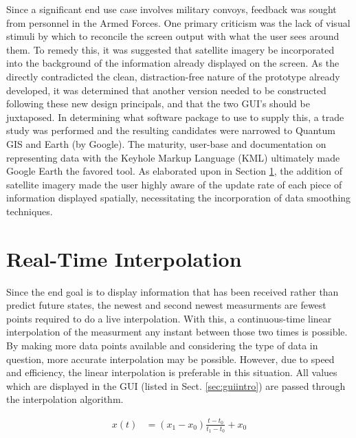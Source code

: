 \documentclass[12pt]{report}
\begin{document}
Since a significant end use case involves military convoys, feedback was sought from personnel in the Armed Forces. One primary criticism was the lack of visual stimuli by which to reconcile the screen output with what the user sees around them. To remedy this, it was suggested that satellite imagery be incorporated into the background of the information already displayed on the screen. As the directly contradicted the clean, distraction-free nature of the prototype already developed, it was determined that another version needed to be constructed following these new design principals, and that the two GUI's should be juxtaposed. In determining what software package to use to supply this, a trade study was performed and the resulting candidates were narrowed to Quantum GIS and Earth (by Google). The maturity, user-base and documentation on representing data with the Keyhole Markup Language (KML) ultimately made Google Earth the favored tool. As elaborated upon in Section \ref{sec:interp}, the addition of satellite imagery made the user highly aware of the update rate of each piece of information displayed spatially, necessitating the incorporation of data smoothing techniques.

\section{Real-Time Interpolation} \label{sec:interp}

Since the end goal is to display information that has been received rather than predict future states, the newest and second newest measurments are fewest points required to do a live interpolation. With this, a continuous-time linear interpolation of the measurment any instant between those two times is possible. By making more data points available and considering the type of data in question, more accurate interpolation may be possible. However, due to speed and efficiency, the linear interpolation is preferable in this situation. All values which are displayed in the GUI (listed in Sect. \ref{sec:guiintro}) are passed through the interpolation algorithm.

\begin{align} \label{eq:interp}
    x(t) &= (x_1 - x_0) \frac{ t - t_0 } { t_1 - t_0 } + x_0
\end{align}
\end{document}
